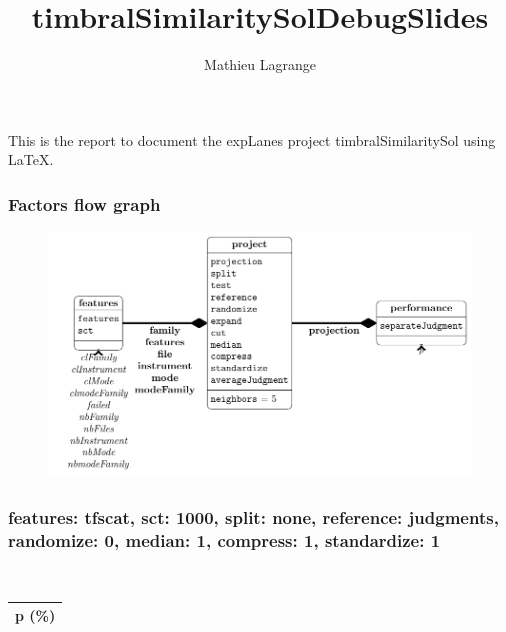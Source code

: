 \documentclass{beamer}
\title{timbralSimilaritySolDebugSlides}
\author{ Mathieu Lagrange }
\begin{document}
           
 
\maketitle           
 
 
This is the report to document the expLanes project timbralSimilaritySol using \LaTeX.           
 
 
 
 
 
\begin{frame}\frametitle{Factors flow graph}         
 
 
\begin{center}        
 
 
\begin{figure}       
 
 
\includegraphics[width=\textwidth,height=0.8\textheight,keepaspectratio]{../figures/factors.pdf}      
 
 
\label{factorFlowGraph}     
 
 
\end{figure}    
 
 
\end{center}   
 
 
\end{frame}  
 
\begin{frame}\frametitle{features: tfscat, sct: 1000, split: none, reference: judgments, randomize: 0, median: 1, compress: 1, standardize: 1} 
  
\begin{table} 
\begin{center} 
\ 
 \setlength{\tabcolsep}{.16667em} 
\begin{tabular}{c} 
p (\%) \\ 
\hline 
\end{tabular} 
\end{center} 
\label{fetfSc1000SpnoRejuRa0Me1Co1St1} 
\end{table} 
 
\end{frame}  
 
 
           
           
 
\end{document}
